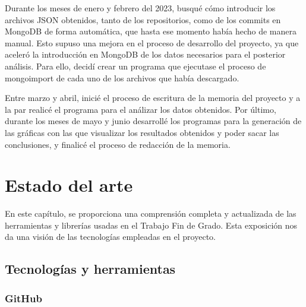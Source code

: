 \documentclass[a4paper, 12pt]{book}
\begin{document}
Durante los meses de enero y febrero del 2023, busqué cómo introducir los archivos JSON obtenidos, tanto de los repositorios, como de los commits en MongoDB de forma automática, que hasta ese momento había hecho de manera manual.
Esto supuso una mejora en el proceso de desarrollo del proyecto, ya que aceleró la introducción en MongoDB de los datos necesarios para el posterior análisis.
Para ello, decidí crear un programa que ejecutase el proceso de mongoimport de cada uno de los archivos que había descargado. 


Entre marzo y abril, inicié el proceso de escritura de la memoria del proyecto y a la par realicé el programa para el análizar los datos obtenidos. 
Por último, durante los meses de mayo y junio desarrollé los programas para la generación de las gráficas con las que visualizar los resultados obtenidos y poder sacar las conclusiones, y finalicé el proceso de redacción de la memoria. 


\cleardoublepage
\chapter{Estado del arte}
\label{chap:estado}

En este capítulo, se proporciona una comprensión completa y actualizada de las herramientas y librerías usadas en el Trabajo Fin de Grado.
Esta exposición nos da una visión de las tecnologías empleadas en el proyecto.

\section{Tecnologías y herramientas} %
\label{sec:tecnologías y herramienta}

\subsection{GitHub} %
\label{sec:github} %
\end{document}
